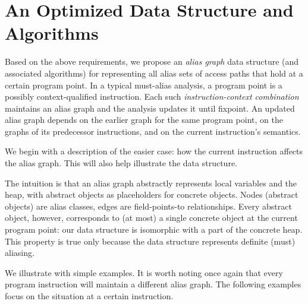 

\section{An Optimized Data Structure and Algorithms}
\label{sec:datastructure}

Based on the above requirements, we propose an \emph{alias graph} data
structure (and associated algorithms) for representing all alias sets
of access paths that hold at a certain program point. In a typical
must-alias analysis, a program point is a possibly context-qualified
instruction. Each such \emph{instruction-context combination} maintains an
alias graph and the analysis updates it until fixpoint. An updated
alias graph depends on the earlier graph for the same program point,
on the graphs of its predecessor instructions, and on the current
instruction's semantics.

We begin with a description of the easier case: how the current
instruction affects the alias graph. This will also help illustrate
the data structure.

The intuition is that an alias graph abstractly represents local
variables and the heap, with abstract objects as placeholders for
concrete objects. Nodes (abstract objects) are alias classes, edges
are field-points-to relationships. Every abstract object, however,
corresponds to (at most) a single concrete object at the current program point:
our data structure is isomorphic with a part of the concrete heap.
This property is true only because the data structure represents
definite (must) aliasing.

We illustrate with simple examples. It is worth noting once again that
every program instruction will maintain a different alias graph. The following
examples focus on the situation at a certain instruction.

